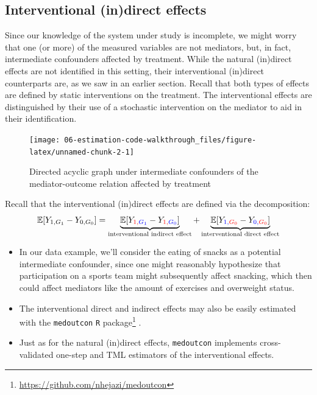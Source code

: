\documentclass[
  12pt,
]{book}
\newcommand{\passthrough}[1]{#1}
\providecommand{\tightlist}{%
  \setlength{\itemsep}{0pt}\setlength{\parskip}{0pt}}
\renewcommand{\href}[2]{#2\footnote{\url{#1}}}
\theoremstyle{definition}
\theoremstyle{definition}
\theoremstyle{definition}
\newcommand{\E}{\mathbb{E}}
\newcommand{\1}{\mathbbm{1}}
\begin{document}
\hypertarget{interventional-indirect-effects-1}{%
\subsection{Interventional (in)direct effects}\label{interventional-indirect-effects-1}}

Since our knowledge of the system under study is incomplete, we might worry that
one (or more) of the measured variables are not mediators, but, in fact,
intermediate confounders affected by treatment. While the natural (in)direct
effects are not identified in this setting, their interventional (in)direct
counterparts are, as we saw in an earlier section. Recall that both types of
effects are defined by static interventions on the treatment. The interventional
effects are distinguished by their use of a stochastic intervention on the
mediator to aid in their identification.

\begin{figure}
  
  {\centering \texttt{[image: 06-estimation-code-walkthrough\_files/figure-latex/unnamed-chunk-2-1]} 
  
  }
  
  \caption{Directed acyclic graph under intermediate confounders of the mediator-outcome relation affected by treatment}\label{fig:unnamed-chunk-2}
  \end{figure}

Recall that the interventional (in)direct effects are defined via the decomposition:
\begin{equation*}
\E[Y_{1,G_1} - Y_{0,G_0}] = \underbrace{\E[Y_{\color{red}{1},\color{blue}{G_1}} -
    Y_{\color{red}{1},\color{blue}{G_0}}]}_{\text{interventional indirect effect}} +
    \underbrace{\E[Y_{\color{blue}{1},\color{red}{G_0}} -
    Y_{\color{blue}{0},\color{red}{G_0}}]}_{\text{interventional direct effect}}
\end{equation*}

\begin{itemize}
\tightlist
\item
  In our data example, we'll consider the eating of snacks as a potential
  intermediate confounder, since one might reasonably hypothesize that
  participation on a sports team might subsequently affect snacking, which then
  could affect mediators like the amount of exercises and overweight status.
\item
  The interventional direct and indirect effects may also be easily estimated
  with the \href{https://github.com/nhejazi/medoutcon}{\passthrough{\lstinline!medoutcon!} \passthrough{\lstinline!R!} package}
  \citep{hejazi2022medoutcon-rpkg, hejazi2022medoutcon-joss}.
\item
  Just as for the natural (in)direct effects, \passthrough{\lstinline!medoutcon!} implements
  cross-validated one-step and TML estimators of the interventional effects.
\end{itemize}
\end{document}
